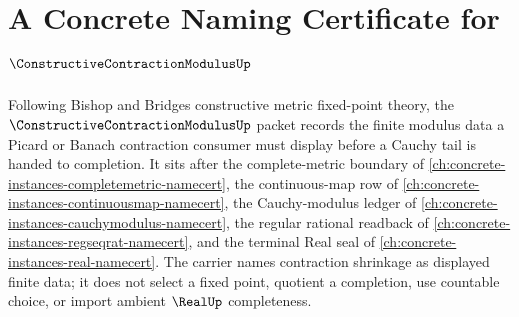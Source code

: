 \chapter{A Concrete Naming Certificate for $\ConstructiveContractionModulusUp$}
\label{ch:concrete-instances-constructive-contraction-modulus-namecert}

Following Bishop and Bridges constructive metric fixed-point theory, the $\ConstructiveContractionModulusUp$ packet records the finite modulus data a Picard or Banach contraction consumer must display before a Cauchy tail is handed to completion. It sits after the complete-metric boundary of \autoref{ch:concrete-instances-completemetric-namecert}, the continuous-map row of \autoref{ch:concrete-instances-continuousmap-namecert}, the Cauchy-modulus ledger of \autoref{ch:concrete-instances-cauchymodulus-namecert}, the regular rational readback of \autoref{ch:concrete-instances-regseqrat-namecert}, and the terminal Real seal of \autoref{ch:concrete-instances-real-namecert}. The carrier names contraction shrinkage as displayed finite data; it does not select a fixed point, quotient a completion, use countable choice, or import ambient $\RealUp$ completeness.

